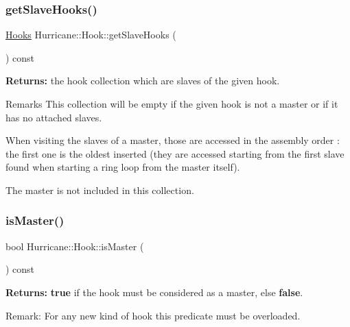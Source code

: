 \subsubsection{\texorpdfstring{get\+Slave\+Hooks()}{getSlaveHooks()}}
{\footnotesize\ttfamily \hyperlink{namespaceHurricane_a9dcd9b74dc5e2b51bec7a13c25807e02}{Hooks} Hurricane\+::\+Hook\+::get\+Slave\+Hooks (\begin{DoxyParamCaption}{ }\end{DoxyParamCaption}) const}

{\bfseries Returns\+:} the hook collection which are slaves of the given hook.

\begin{DoxyRemark}{Remarks}
This collection will be empty if the given hook is not a master or if it has no attached slaves.
\end{DoxyRemark}
When visiting the slaves of a master, those are accessed in the assembly order \+: the first one is the oldest inserted (they are accessed starting from the first slave found when starting a ring loop from the master itself).

The master is not included in this collection. \mbox{\label{classHurricane_1_1Hook_af0940eb0761f05df0b82c4198e22a01c}} 
\subsubsection{\texorpdfstring{is\+Master()}{isMaster()}}
{\footnotesize\ttfamily bool Hurricane\+::\+Hook\+::is\+Master (\begin{DoxyParamCaption}{ }\end{DoxyParamCaption}) const\hspace{0.3cm}{\ttfamily [pure virtual]}}

{\bfseries Returns\+:} {\bfseries true} if the hook must be considered as a master, else {\bfseries false}.

\begin{DoxyParagraph}{Remark\+:}
For any new kind of hook this predicate must be overloaded. 
\end{DoxyParagraph}
\mbox{\label{classHurricane_1_1Hook_acd62c7de2c023a1013d5a728159d068d}} 
